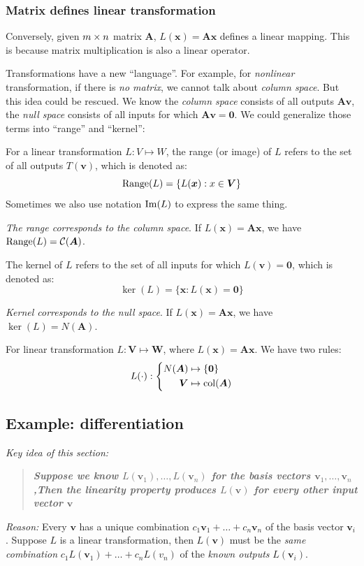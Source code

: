 \subsubsection{Matrix defines linear transformation}
Conversely, given $m\times n$ matrix $\bm A$, $L(\bm x) = \bm{Ax}$ defines a linear mapping. This is because matrix multiplication is also a linear operator.

\begin{remark}
Transformations have a new ``language''. For example, for \textit{nonlinear} transformation, if there is \emph{no matrix}, we cannot talk about \emph{column space}. But this idea could be rescued. We know the \textit{column space} consists of all outputs $\bm{Av}$, the \textit{null space} consists of all inputs for which $\bm{Av}=\bm 0$. We could generalize those terms into ``range'' and ``kernel'':
\end{remark}
\begin{definition}[range]
For a linear transformation $L:V\mapsto W$, the range (or image) of $L$ refers to the set of all outputs $T(\bm v)$, which is denoted as:
\[
\operatorname{Range}(L)=\{L(\bm x):x\in\bm V\}
\]
Sometimes we also use notation $\operatorname{Im}(L)$ to express the same thing.
\end{definition}
\emph{The range corresponds to the column space}. If $L(\bm x)=\bm{Ax}$, we have $\operatorname{Range}(L)=\mathcal{C}(\bm A)$.
\begin{definition}[kernel]
The kernel of $L$ refers to the set of all inputs for which $L(\bm v)=\bm 0$, which is denoted as:
\[
\ker(L)=\{\bm x:L(\bm x)=\bm 0\}
\]
\end{definition}
\emph{Kernel corresponds to the null space}. If $L(\bm x)=\bm{Ax}$, we have $\ker(L)=N(\bm A)$.
\begin{remark}
For linear transformation $L:\bm V\mapsto \bm W$, where $L(\bm x)=\bm{Ax}$. We have two rules:
\[
L(\cdot):\left\{
\begin{aligned}
N(\bm A)&\mapsto \{\bm 0\}\\
\bm V&\mapsto \operatorname{col}(\bm A)
\end{aligned}\right.
\]
\end{remark}
\subsection{Example: differentiation}
\emph{Key idea of this section:}
\begin{quotation}
{\bfseries\textit{Suppose we know $L(\bm v_1),\dots,L(\bm v_n)$ for the basis vectors $\bm v_1,\dots,\bm v_n$,Then the linearity property produces $L(\bm v)$ for every other input vector $\bm v$}}
\end{quotation}
\emph{Reason:} Every $\bm v$ has a unique combination $c_1\bm v_1+\dots+c_n\bm v_n$ of the basis vector $\bm v_i$. Suppose $L$ is a linear transformation, then $L(\bm v)$ must be the \emph{same combination} $c_1L(\bm v_1)+\dots+c_nL(v_n)$ of the \emph{known outputs} $L(\bm v_i)$.

